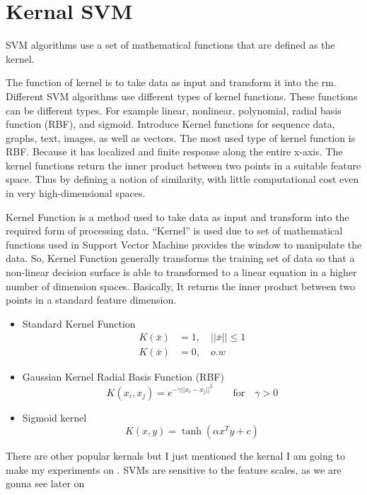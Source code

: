 \documentclass{article}
\begin{document}
	\section{Kernal SVM}
	SVM algorithms use a set of mathematical functions that are defined as the kernel. 
	
	The function of kernel is to take data as input and transform it into the rm. Different SVM algorithms use different types of kernel functions. These functions can be different types. For example linear, nonlinear, polynomial, radial basis function (RBF), and sigmoid.
	Introduce Kernel functions for sequence data, graphs, text, images, as well as vectors. The most used type of kernel function is RBF. Because it has localized and finite response along the entire x-axis.
	The kernel functions return the inner product between two points in a suitable feature space. Thus by defining a notion of similarity, with little computational cost even in very high-dimensional spaces.
	
	Kernel Function is a method used to take data as input and transform into the required form of processing data. “Kernel” is used due to set of mathematical functions used in Support Vector Machine provides the window to manipulate the data. So, Kernel Function generally transforms the training set of data so that a non-linear decision surface is able to transformed to a linear equation in a higher number of dimension spaces. Basically, It returns the inner product between two points in a standard feature dimension.
	
	\begin{itemize}
		\item Standard Kernel Function 
		\begin{eqnarray*}
			K ( \bar x) &= 1 , \quad ||\bar x||  \leq 1 \\
			K(\bar x) &= 0  , \quad o.w	
		\end{eqnarray*}
		\item Gaussian Kernel Radial Basis Function (RBF)
		\begin{equation*}
			K(x_i,x_j) = e^{-\gamma ||x_i-x_j||^2}  \quad \quad \text{for} \quad \gamma > 0
		\end{equation*}
		\item Sigmoid kernel
		\begin{equation*}
			K(x,y) = \tanh (\alpha x^Ty + c)
		\end{equation*}
	\end{itemize}
	There are other popular kernals but I just mentioned the kernal I am going to make my experiments on . SVMs are sensitive to the feature scales, as we are gonna see later on
	
	
\end{document}
